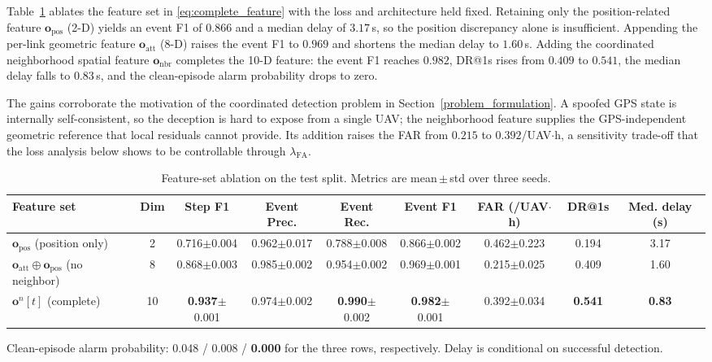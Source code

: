 Table~\ref{tab:feature_ablation} ablates the feature set in
\eqref{eq:complete_feature} with the loss and architecture held fixed.
Retaining only the position-related feature $\mathbf{o}_{\mathrm{pos}}$
(2-D) yields an event F1 of $0.866$ and a median delay of $3.17$\,s, so the
position discrepancy alone is insufficient. Appending the per-link
geometric feature $\mathbf{o}_{\mathrm{att}}$ (8-D) raises the event F1 to
$0.969$ and shortens the median delay to $1.60$\,s. Adding the coordinated
neighborhood spatial feature $\mathbf{o}_{\mathrm{nbr}}$ completes the 10-D
feature: the event F1 reaches $0.982$, DR@1s rises from $0.409$ to $0.541$,
the median delay falls to $0.83$\,s, and the clean-episode alarm probability
drops to zero.

The gains corroborate the motivation of the coordinated detection problem in
Section~\ref{problem_formulation}. A spoofed GPS state is internally
self-consistent, so the deception is hard to expose from a single UAV; the
neighborhood feature supplies the GPS-independent geometric reference that
local residuals cannot provide. Its addition raises the FAR from $0.215$ to
$0.392$/UAV$\cdot$h, a sensitivity trade-off that the loss analysis below
shows to be controllable through $\lambda_{\mathrm{FA}}$.

\begin{table}[htbp]
  \centering
  \caption{Feature-set ablation on the test split. Metrics are
    mean\,$\pm$\,std over three seeds.}
  \label{tab:feature_ablation}
  \begin{tabular}{lcc ccc ccc}
    \toprule
    Feature set & Dim & Step F1 & Event Prec. & Event Rec. & Event F1
      & FAR (/UAV$\cdot$h) & DR@1s & Med. delay (s) \\
    \midrule
    $\mathbf{o}_{\mathrm{pos}}$ (position only) & 2  & 0.716$\pm$0.004
      & 0.962$\pm$0.017 & 0.788$\pm$0.008
      & 0.866$\pm$0.002 & 0.462$\pm$0.223 & 0.194 & 3.17 \\
    $\mathbf{o}_{\mathrm{att}}\oplus\mathbf{o}_{\mathrm{pos}}$ (no neighbor)
      & 8  & 0.868$\pm$0.003 & 0.985$\pm$0.002 & 0.954$\pm$0.002
      & 0.969$\pm$0.001 & 0.215$\pm$0.025 & 0.409 & 1.60 \\
    $\mathbf{o}^n[t]$ (complete) & 10 & \textbf{0.937}$\pm$0.001
      & 0.974$\pm$0.002 & \textbf{0.990}$\pm$0.002
      & \textbf{0.982}$\pm$0.001 & 0.392$\pm$0.034
      & \textbf{0.541} & \textbf{0.83} \\
    \bottomrule
  \end{tabular}
  \smallskip
  \footnotesize{Clean-episode alarm probability: 0.048 / 0.008 /
  \textbf{0.000} for the three rows, respectively. Delay is conditional on
  successful detection.}
\end{table}

